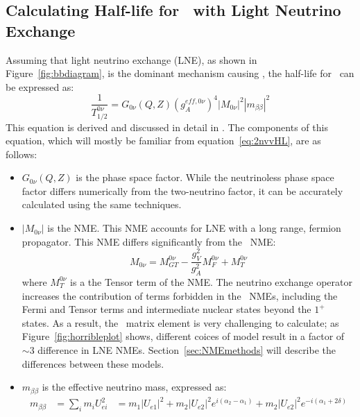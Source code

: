 \documentclass[/main.tex]{subfiles}
\begin{document}
\subsection{Calculating Half-life for \znbb\ with Light Neutrino Exchange}
Assuming that light neutrino exchange (LNE), as shown in Figure~\ref{fig:bbdiagram}, is the dominant mechanism causing \znbb, the half-life for \znbb\ can be expressed as:
\begin{equation}
  \frac{1}{T^{0\nu}_{1/2}}=G_{0\nu}(Q,Z)(g_A^{eff,0\nu})^4|M_{0\nu}|^2|m_{\beta\beta}|^2
\end{equation}
This equation is derived and discussed in detail in \cite{Avignone2008, Engel2017}.
The components of this equation, which will mostly be familiar from equation~\ref{eq:2nvvHL}, are as follows:
\begin{itemize}
\item $G_{0\nu}(Q,Z)$ is the phase space factor.
  While the neutrinoless phase space factor differs numerically from the two-neutrino factor, it can be accurately calculated using the same techniques.
\item $|M_{0\nu}|$ is the NME.
  This NME accounts for LNE with a long range, fermion propagator.
  This NME differs significantly from the \tnbb\ NME:
  \begin{equation}
    M_{0\nu}=M^{0\nu}_{GT} - \frac{g_V^2}{g_A^2}M^{0\nu}_F+M^{0\nu}_T
  \end{equation}
  where $M^{0\nu}_T$ is a the Tensor term of the NME.
  The neutrino exchange operator increases the contribution of terms forbidden in the \tnbb\ NMEs, including the Fermi and Tensor terms and intermediate nuclear states beyond the $1^+$ states.
  As a result, the \znbb\ matrix element is very challenging to calculate; as Figure~\ref{fig:horribleplot} shows, different coices of model result in a factor of ${\sim}3$ difference in LNE NMEs.
  Section~\ref{sec:NMEmethods} will describe the differences between these models.
\item $m_{\beta\beta}$ is the effective neutrino mass, expressed as:
  \begin{equation} \label{eq:mbb}
    \begin{aligned}
      m_{\beta\beta}&=\sum_i m_iU_{ei}^2
      &=m_1|U_{e1}|^2+m_2|U_{e2}|^2e^{i(\alpha_2-\alpha_1)}+m_2|U_{e2}|^2e^{-i(\alpha_1+2\delta)}
    \end{aligned}
  \end{equation}
  \begin{figure}[p]
    \centering

\end{figure}
\end{itemize}
\end{document}
